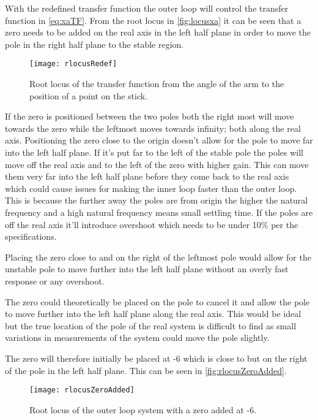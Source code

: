 With the redefined transfer function the outer loop will control the transfer function in \autoref{eq:xaTF}. From the root locus in \autoref{fig:locusxa} it can be seen that a zero needs to be added on the real axis in the left half plane in order to move the pole in the right half plane to the stable region. 

\begin{figure}[htbp]
\centering
\texttt{[image: rlocusRedef]}
\caption{Root locus of the transfer function from the angle of the arm to the position of a point on the stick.}
\label{fig:locusxa}
\end{figure}

If the zero is positioned between the two poles both the right most will move towards the zero while the leftmost moves towards infinity; both along the real axis. Positioning the zero close to the origin doesn't allow for the pole to move far into the left half plane. If it's put far to the left of the stable pole the poles will move off the real axis and to the left of the zero with higher gain. This can move them very far into the left half plane before they come back to the real axis which could cause issues for making the inner loop faster than the outer loop. This is because the further away the poles are from origin the higher the natural frequency and a high natural frequency means small settling time. If the poles are off the real axis it'll introduce overshoot which needs to be under 10\% per the specifications. 

Placing the zero close to and on the right of the leftmost pole would allow for the unstable pole to move further into the left half plane without an overly fast response or any overshoot. 

The zero could theoretically be placed on the pole to cancel it and allow the pole to move further into the left half plane along the real axis. This would be ideal but the true location of the pole of the real system is difficult to find as small variations in measurements of the system could move the pole slightly. 

The zero will therefore initially be placed at -6 which is close to but on the right of the pole in the left half plane. This can be seen in \autoref{fig:rlocusZeroAdded}.

\begin{figure}[htbp]
\centering
\texttt{[image: rlocusZeroAdded]}
\caption{Root locus of the outer loop system with a zero added at -6.}
\label{fig:rlocusZeroAdded}
\end{figure}

